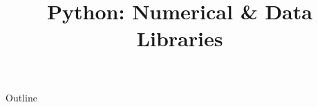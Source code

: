 \documentclass[xcolor=dvipsnames,compress,t,pdf]{beamer}
\title[\insertframenumber /\inserttotalframenumber]{Python: Numerical \& Data Libraries}
\begin{document}
	\begin{frame}
	\titlepage
	\end{frame}

	\begin{frame}{Outline}
	    \tableofcontents
	\end{frame}

	
	
	
\end{document}
